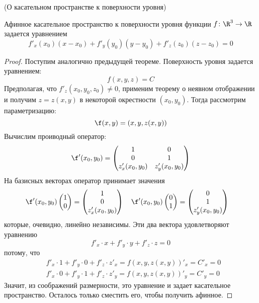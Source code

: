 \begin{theorem}(О касательном пространстве к поверхности уровня)

    Афинное касательное пространство к поверхности уровня функции $f \colon \R^3 \to \R$
    задается уравнением
\[
    f'_x(x_0)(x - x_0) + f'_y(y_0)(y - y_0) + f'_z(z_0)(z - z_0) = 0
\]
\end{theorem}
\begin{proof}
    Поступим аналогично предыдущей теореме. Поверхность уровня задается уравнением:
\[
    f(x, y, z) = C
\]
    Предполагая, что $f'_z(x_0, y_0, z_0) \neq 0$, применим теорему о неявном
    отображении и получим $z = z(x, y)$ в некоторой окрестности $(x_0, y_0)$.
    Тогда рассмотрим параметризацию:
\[
    \f(x, y) = (x, y, z(x, y))
\]
    Вычислим проиводный оператор:
\[
    \f'(x_0, y_0) = \begin{pmatrix}
                        1 & 0 \\
                        0 & 1 \\
                        z'_x(x_0, y_0) & z'_y(x_0, y_0)
                    \end{pmatrix}
\]
    На базисных векторах оператор принимает значения
\[
    \f'(x_0, y_0)\begin{pmatrix}
                     1 \\
                     0 \\
                 \end{pmatrix} = \begin{pmatrix}
                                     1 \\
                                     0 \\
                                     z'_x(x_0, y_0)
                                 \end{pmatrix}~~~
     \f'(x_0, y_0)\begin{pmatrix}
                     0 \\
                     1 \\
                  \end{pmatrix} = \begin{pmatrix}
                                      0 \\
                                      1 \\
                                      z'_y(x_0, y_0)
                                  \end{pmatrix}~~~
\]
    которые, очевидно, линейно независимы. Эти два вектора удовлетворяют
    уравнению
\[
    f'_x \cdot x + f'_y \cdot y + f'_z \cdot z = 0
\]
    потому, что
\begin{align*}
    &f'_x \cdot 1 + f'_y \cdot 0 + f'_z \cdot z'_x =
    f(x, y, z(x, y))'_x = C'_x = 0 \\
    &f'_x \cdot 0 + f'_y \cdot 1 + f'_z \cdot z'_y =
    f(x, y, z(x, y))'_y = C'_y = 0
\end{align*}
    Значит, из соображений размерности, это уравнение и задает касательное
    пространство. Осталось только сместить его, чтобы получить афинное.
\end{proof}
